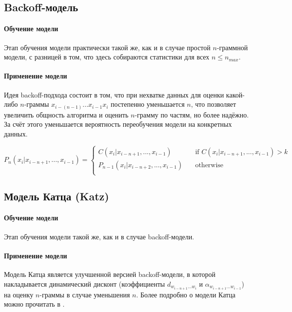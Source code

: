 \subsection{ Backoff-модель } 

\paragraph{ Обучение модели } Этап обучения модели практически такой же, как и в случае простой $n$-граммной модели, с разницей в том, что здесь собираются статистики для всех $n \leq n_{max}$.

\paragraph{ Применение модели } Идея backoff-подхода состоит в том, что при нехватке данных для оценки какой-либо $n$-граммы $x_{i - (n - 1)} ... x_{i - 1} x_i$ постепенно уменьшается $n$, что позволяет увеличить общность алгоритма и оценить $n$-грамму по частям, но более надёжно. За счёт этого уменьшается вероятность переобучения модели на конкретных данных. 

\[ P_n(x_i | x_{i - n + 1}, ..., x_{i - 1}) =
\begin{cases}
	C(x_i | x_{i - n + 1}, ..., x_{i - 1})       & \quad \text{if } C(x_i | x_{i - n + 1}, ..., x_{i - 1}) > k\\
	P_{n - 1}(x_i | x_{i - n + 2}, ..., x_{i - 1})  & \quad \text{otherwise }\\
\end{cases}
\]

\subsection{ Модель Катца (Katz) }

\paragraph{ Обучение модели } Этап обучения модели такой же, как и в случае backoff-модели.

\paragraph{ Применение модели } Модель Катца является улучшенной версией backoff-модели, в которой накладывается динамический дисконт (коэффициенты $d_{w_{i-n+1}...w_i}$ и $\alpha_{w_{i-n+1}...w_{i-1}}$) на оценку $n$-граммы в случае уменьшения $n$. Более подробно о модели Катца можно прочитать в \cite{katz:backoff}.

